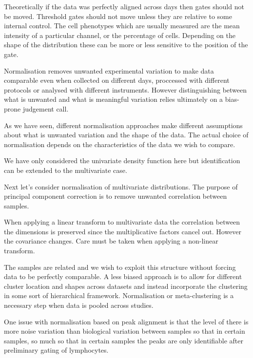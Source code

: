 Theoretically if the data was perfectly aligned across days then gates should not be moved.  
Threshold gates should not move unless they are relative to some internal control.
The cell phenotypes which are usually measured are the mean intensity of a particular channel, or the percentage of cells.
Depending on the shape of the distribution these can be more or less sensitive to the position of the gate.

Normalisation removes unwanted experimental variation to make data comparable even when collected on different days,
proccessed with different protocols or analysed with different instruments.
However distinguishing between what is unwanted and what is meaningful variation relies ultimately on a bias-prone judgement call.

As we have seen, different normalisation approaches make different assumptions about what is unwanted variation and the shape of the data.
The actual choice of normalisation depends on the characteristics of the data we wish to compare.

We have only considered the univariate density function here but identification can be extended to the multivariate case.

Next let's consider normalisation of multivariate distributions.  
The purpose of principal component correction is to remove unwanted correlation between samples.

When applying a linear transform to multivariate data the correlation between the dimensions is preserved since the multiplicative factors cancel out.
However the covariance changes.
Care must be taken when applying a non-linear transform.  

The samples are related and we wish to exploit this structure without forcing data to be perfectly comparable.
A less biased approach is to allow for different cluster location and shapes across datasets and instead incorporate the clustering in some sort of hierarchical framework.  
Normalisation or meta-clustering is a necessary step when data is pooled across studies.

One issue with normalisation based on peak alignment is that the level of there is more noise variation than biological variation between samples so that in certain samples,
so much so that in certain samples the peaks are only identifiable after preliminary gating of lymphocytes.




